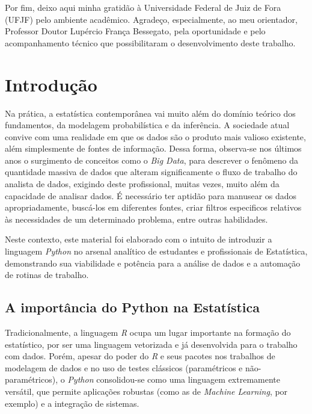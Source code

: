 \documentclass[
  brazilian,
  letterpaper,
  DIV=11,
  numbers=noendperiod]{scrreprt}
\begin{document}
Por fim, deixo aqui minha gratidão à Universidade Federal de Juiz de
Fora (UFJF) pelo ambiente acadêmico. Agradeço, especialmente, ao meu
orientador, Professor Doutor Lupércio França Bessegato, pela
oportunidade e pelo acompanhamento técnico que possibilitaram o
desenvolvimento deste trabalho.


\chapter{Introdução}\label{introduuxe7uxe3o}

Na prática, a estatística contemporânea vai muito além do domínio
teórico dos fundamentos, da modelagem probabilística e da inferência. A
sociedade atual convive com uma realidade em que os dados são o produto
mais valioso existente, além simplesmente de fontes de informação. Dessa
forma, observa-se nos últimos anos o surgimento de conceitos como o
\emph{Big Data}, para descrever o fenômeno da quantidade massiva de
dados que alteram significamente o fluxo de trabalho do analista de
dados, exigindo deste profissional, muitas vezes, muito além da
capacidade de analisar dados. É necessário ter aptidão para manusear os
dados apropriadamente, buscá-los em diferentes fontes, criar filtros
especificos relativos às necessidades de um determinado problema, entre
outras habilidades.

Neste contexto, este material foi elaborado com o intuito de introduzir
a linguagem \emph{Python} no arsenal analítico de estudantes e
profissionais de Estatística, demonstrando sua viabilidade e potência
para a análise de dados e a automação de rotinas de trabalho.

\section{A importância do Python na
Estatística}\label{a-importuxe2ncia-do-python-na-estatuxedstica}

Tradicionalmente, a linguagem \emph{R} ocupa um lugar importante na
formação do estatístico, por ser uma linguagem vetorizada e já
desenvolvida para o trabalho com dados. Porém, apesar do poder do
\emph{R} e seus pacotes nos trabalhos de modelagem de dados e no uso de
testes clássicos (paramétricos e não-paramétricos), o \emph{Python}
consolidou-se como uma linguagem extremamente versátil, que permite
aplicações robustas (como as de \emph{Machine Learning}, por exemplo) e
a integração de sistemas.
\end{document}
